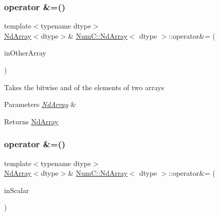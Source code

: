 \subsubsection{\texorpdfstring{operator \&=()}{operator \&=()}\hspace{0.1cm}{\footnotesize\ttfamily [1/2]}}
{\footnotesize\ttfamily template$<$typename dtype$>$ \\
\mbox{\hyperlink{class_num_c_1_1_nd_array}{Nd\+Array}}$<$dtype$>$\& \mbox{\hyperlink{class_num_c_1_1_nd_array}{Num\+C\+::\+Nd\+Array}}$<$ dtype $>$\+::operator\&= (\begin{DoxyParamCaption}\item[{const \mbox{\hyperlink{class_num_c_1_1_nd_array}{Nd\+Array}}$<$ dtype $>$ \&}]{in\+Other\+Array }\end{DoxyParamCaption})\hspace{0.3cm}{\ttfamily [inline]}}

Takes the bitwise and of the elements of two arrays


\begin{DoxyParams}{Parameters}
{\em \mbox{\hyperlink{class_num_c_1_1_nd_array}{Nd\+Array}}} & \\
\hline
\end{DoxyParams}
\begin{DoxyReturn}{Returns}
\mbox{\hyperlink{class_num_c_1_1_nd_array}{Nd\+Array}} 
\end{DoxyReturn}
\mbox{\label{class_num_c_1_1_nd_array_aa7d1db0e3ce1e1ac3697bde5bb61dbd5}} 
\subsubsection{\texorpdfstring{operator \&=()}{operator \&=()}\hspace{0.1cm}{\footnotesize\ttfamily [2/2]}}
{\footnotesize\ttfamily template$<$typename dtype$>$ \\
\mbox{\hyperlink{class_num_c_1_1_nd_array}{Nd\+Array}}$<$dtype$>$\& \mbox{\hyperlink{class_num_c_1_1_nd_array}{Num\+C\+::\+Nd\+Array}}$<$ dtype $>$\+::operator\&= (\begin{DoxyParamCaption}\item[{dtype}]{in\+Scalar }\end{DoxyParamCaption})\hspace{0.3cm}{\ttfamily [inline]}}

